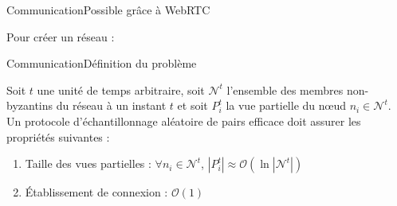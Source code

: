 \begin{frame}{Communication}{Possible grâce à WebRTC}
  \begin{minipage}{0.6\textwidth}
    Pour créer un réseau : 
    \begin{itemize}
    \end{itemize}
  \end{minipage}
  \begin{minipage}{0.3\textwidth}
    \begin{center}
      
    \end{center}
  \end{minipage}
  
  
  
  

  
\end{frame}





\begin{frame}{Communication}{Définition du problème}

\begin{problem}
  \label{net:problem:properties}
  Soit $t$ une unité de temps arbitraire, soit $\mathcal{N}^t$ l'ensemble des
  membres non-byzantins du réseau à un instant $t$ et soit $P_i^t$ la vue
  partielle du nœud $n_i \in \mathcal{N}^t$. Un protocole d'échantillonnage
  aléatoire de pairs efficace doit assurer les propriétés suivantes :
  \begin{enumerate}
  \item Taille des vues partielles : \hfill $\forall n_i \in \mathcal{N}^t$,
    $|P_i^t| \approx \mathcal{O}(\ln |\mathcal{N}^t|)$
  \item Établissement de connexion : \hfill $\mathcal{O}(1)$
  \end{enumerate}
\end{problem}

\end{frame}


